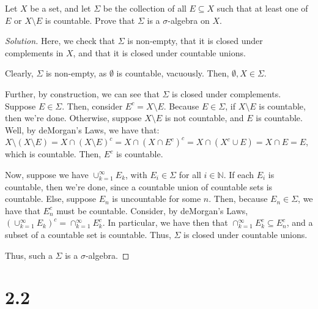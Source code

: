 \documentclass[10pt]{article}
\newenvironment{problem}[2][Problem]{\begin{trivlist}
\item[\hskip \labelsep {\bfseries #1}\hskip \labelsep {\bfseries #2.}]}{\end{trivlist}}
\begin{document}
\begin{problem}{2.2.50}
Let $X$ be a set, and let $\Sigma$ be the collection of all $E \subseteq X$ such that at least one of $E$ or $X\setminus E$ is countable. Prove that $\Sigma$ is a $\sigma$-algebra on $X$.
\end{problem}
\begin{proof}[Solution]
Here, we check that $\Sigma$ is non-empty, that it is closed under complements in $X$, and that it is closed under countable unions.

Clearly, $\Sigma$ is non-empty, as $\emptyset$ is countable, vacuously. Then, $\emptyset, X \in \Sigma$.

Further, by construction, we can see that $\Sigma$ is closed under complements. Suppose $E \in \Sigma$. Then, consider $E^c = X \setminus E$. Because $E \in \Sigma$, if $X \setminus E$ is countable, then we're done. Otherwise, suppose $X \setminus E$ is not countable, and $E$ is countable. Well, by deMorgan's Laws, we have that: $X \setminus (X \setminus E) = X \cap (X \setminus E)^c = X \cap (X \cap E^c)^c = X \cap (X^c \cup E) = X \cap E = E$, which is countable. Then, $E^c$ is countable.

Now, suppose we have $\cup_{k=1}^\infty E_k$, with $E_i \in \Sigma$ for all $i \in \mathbb{N}$. If each $E_i$ is countable, then we're done, since a countable union of countable sets is countable. Else, suppose $E_n$ is uncountable for some $n$. Then, because $E_n \in \Sigma$, we have that $E_n^c$ must be countable. Consider, by deMorgan's Laws, $(\cup_{k=1}^\infty E_k)^c = \cap_{k=1}^\infty E_k^c $. In particular, we have then that $ \cap_{k=1}^\infty E_k^c  \subseteq E_n^c$, and a subset of a countable set is countable. Thus, $\Sigma$ is closed under countable unions.

Thus, such a $\Sigma$ is a $\sigma$-algebra.
\end{proof}

\section*{2.2}
\end{document}
